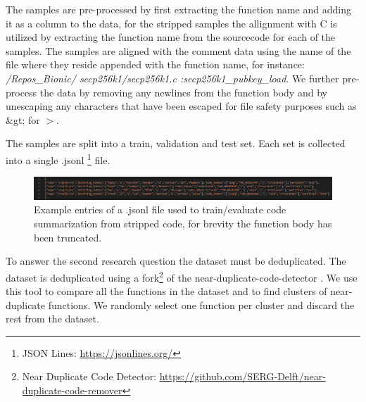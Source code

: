 The samples are pre-processed by first extracting the function name and adding it as a column to the data, for the stripped samples the allignment with C is utilized by extracting the function name from the sourcecode for each of the samples. The samples are aligned with the comment data using the name of the file where they reside appended with the function name, for instance: \textit{/Repos\_Bionic/ secp256k1/secp256k1.c :secp256k1\_pubkey\_load}. We further pre-process the data by removing any newlines from the function body and by unescaping any characters that have been escaped for file safety purposes such as \&gt; for $>$.

The samples are split into a train, validation and test set. Each set is collected into a single .jsonl \footnote{JSON Lines: \url{https://jsonlines.org/}} file.

\label{fig:jsonl}
\begin{figure}[H]
  \centering
  \includegraphics[width=\linewidth]{img/jsonl.png}
  \caption{Example entries of a .jsonl file used to train/evaluate code summarization from stripped code, for brevity the function body has been truncated.}
\end{figure}



To answer the second research question the dataset must be deduplicated. The dataset is deduplicated using a fork\footnote{Near Duplicate Code Detector: \url{https://github.com/SERG-Delft/near-duplicate-code-remover}} of the near-duplicate-code-detector \cite{allamanis_adverse}. We use this tool to compare all the functions in the dataset and to find clusters of near-duplicate functions. We randomly select one function per cluster and discard the rest from the dataset. 


